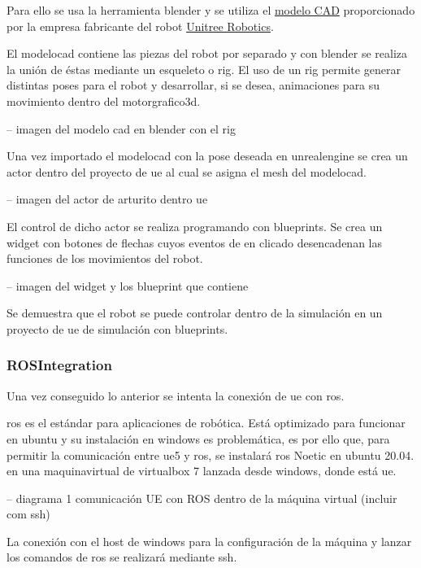 \documentclass[a4paper, 12pt, spanish, twoside]{article}
\begin{document}
Para ello se usa la herramienta \gls{blender} y se utiliza el \href{https://github.com/unitreerobotics/unitree_cad/tree/main/a1}{modelo CAD} proporcionado por la empresa fabricante del robot \href{https://www.unitree.com/}{Unitree Robotics}.  

El \gls{modelocad} contiene las piezas del robot por separado y con \gls{blender} se realiza la unión de éstas mediante un esqueleto o \gls{rig}. El uso de un \gls{rig} permite generar distintas poses para el robot y desarrollar, si se desea, animaciones para su movimiento dentro del \gls{motorgrafico3d}. 

-- imagen del modelo cad en blender con el rig 

Una vez importado el \gls{modelocad} con la pose deseada en \gls{unrealengine} se crea un \gls{actor} dentro del proyecto de \acrshort{ue} al cual se asigna el \gls{mesh} del \gls{modelocad}.  

-- imagen del actor de arturito dentro ue 

El control de dicho \gls{actor} se realiza programando con \glspl{blueprint}. Se crea un \gls{widget} con botones de flechas cuyos eventos de en clicado desencadenan las funciones de los movimientos del robot.  

-- imagen del widget y los blueprint que contiene 

Se demuestra que el robot se puede controlar dentro de la simulación en un proyecto de \acrshort{ue} de simulación con \glspl{blueprint}. 

\subsubsection{ROSIntegration} \label{sec:implementacion:nerfstudio-volinga:rosintegration}

Una vez conseguido lo anterior se intenta la conexión de \acrshort{ue} con \acrshort{ros}.  

\acrshort{ros} es el estándar para aplicaciones de robótica. Está optimizado para funcionar en \gls{ubuntu} y su instalación en \gls{windows} es problemática, es por ello que, para permitir la comunicación entre \acrshort{ue}5 y \acrshort{ros}, se instalará \acrshort{ros} Noetic en \gls{ubuntu} 20.04. en una \gls{maquinavirtual} de \gls{virtualbox} 7 lanzada desde \gls{windows}, donde está \acrshort{ue}.  

-- diagrama 1 comunicación UE con ROS dentro de la máquina virtual (incluir com ssh) 

La conexión con el \gls{host} de \gls{windows} para la configuración de la máquina y lanzar los comandos de \acrshort{ros} se realizará mediante \acrshort{ssh}.  
\end{document}
